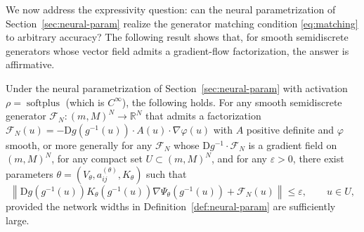 \documentclass[hidelinks,review,nohypdvips,onefignum,onetabnum]{siamart220329}
\newcommand{\R}{\mathbb{R}}
\newcommand{\cFN}{\mathcal{F}_N}
\newcommand{\softplus}{\operatorname{softplus}}
\newcommand{\norm}[1]{\left\lVert #1 \right\rVert}
\begin{document}
We now address the expressivity question: can the neural parametrization of Section~\ref{sec:neural-param} realize the generator matching condition \eqref{eq:matching} to arbitrary accuracy? The following result shows that, for smooth semidiscrete generators whose vector field admits a gradient-flow factorization, the answer is affirmative.

\begin{proposition}\label{prop:universal-approx}
Under the neural parametrization of Section~\ref{sec:neural-param} with activation $\rho=\softplus$ (which is $C^{\infty}$), the following holds. For any smooth semidiscrete generator $\cFN:(m,M)^N\to \R^N$ that admits a factorization $\cFN(u) = -\mathrm{D}g(g^{-1}(u))\cdot A(u)\cdot \nabla \varphi(u)$ with $A$ positive definite and $\varphi$ smooth, or more generally for any $\cFN$ whose $\mathrm{D}g^{-1}\cdot \cFN$ is a gradient field on $(m,M)^N$, for any compact set $U\subset (m,M)^N$, and for any $\varepsilon>0$, there exist parameters $\theta=(V_{\theta},a_{ij}^{(\theta)},K_{\theta})$ such that
\begin{equation}\label{eq:universal-approx}
\norm{\mathrm{D}g(g^{-1}(u))K_{\theta}(g^{-1}(u))\nabla \Psi_{\theta}(g^{-1}(u))+\cFN(u)}\le \varepsilon, \qquad u\in U,
\end{equation}
provided the network widths in Definition~\ref{def:neural-param} are sufficiently large.
\end{proposition}
\end{document}
